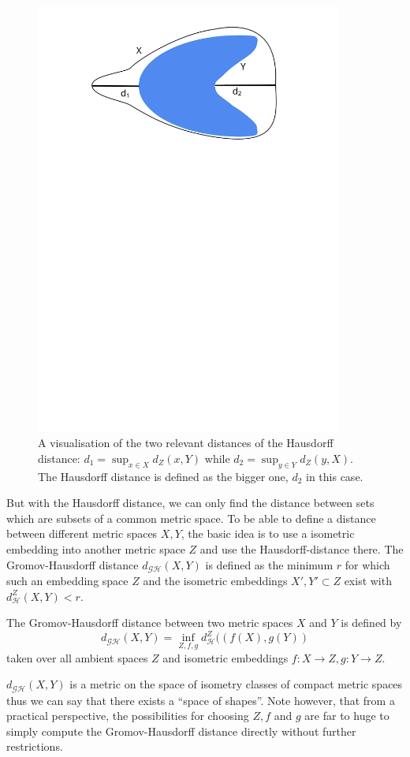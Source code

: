 \begin{figure}[h]
	\centering
	\includegraphics[width = 0.9\textwidth]{pictures/hausdorff}
	\caption{A visualisation of the two relevant distances of the Hausdorff distance: $d_1 = \sup_{x \in X} d_Z(x,Y)$ while $d_2 = \sup_{y \in Y} d_Z(y,X)$. The Hausdorff distance is defined as the bigger one, $d_2$ in this case.}
	\label{fig:hausdorff}
\end{figure}

But with the Hausdorff distance, we can only find the distance between sets which are subsets of a common metric space.
To be able to define a distance between different metric spaces $X,Y$, the basic idea is to use a isometric embedding into another metric space $Z$ and use the Hausdorff-distance there.
The Gromov-Hausdorff distance $d_\mathcal{GH}(X,Y)$ is defined as the minimum $r$ for which such an embedding space $Z$ and the isometric embeddings $X',Y'\subset Z$ exist with $d^Z_\mathcal{H}(X,Y) < r$.
\begin{mydef}
	The Gromov-Hausdorff distance between two metric spaces $X$ and $Y$ is defined by
	$$d_\mathcal{GH}(X,Y) = \inf_{Z,f,g} d^Z_\mathcal{H}((f(X), g(Y))$$
	taken over all ambient spaces $Z$ and isometric embeddings $f:X \rightarrow Z, g: Y \rightarrow Z$.
\end{mydef}
$d_\mathcal{GH}(X,Y)$ is a metric on the space of isometry classes of compact metric spaces thus we can say that there exists a ``space of shapes''.
Note however, that from a practical perspective, the possibilities for choosing $Z,f$ and $g$ are far to huge to simply compute the Gromov-Hausdorff distance directly without further restrictions.

